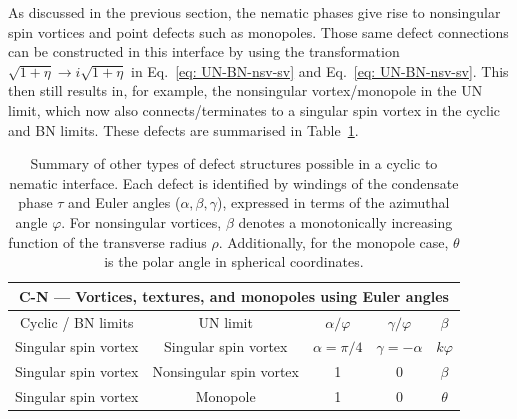 As discussed in the previous section, the nematic phases give rise to
nonsingular spin vortices and point defects such as monopoles.
Those same defect connections can be constructed in this interface by using
the transformation \(\sqrt{1+\eta} \rightarrow i\sqrt{1+\eta}\) in
Eq.~\eqref{eq: UN-BN-nsv-sv} and Eq.~\eqref{eq: UN-BN-nsv-sv}.
This then still results in, for example, the nonsingular vortex/monopole in the
UN limit, which now also connects/terminates to a singular spin vortex in the
cyclic and BN limits.
These defects are summarised in Table~\ref{tab: C-N-other}.
\begin{table}
    \centering
    \begin{tabular}{ccccc}
        \toprule
        \multicolumn{5}{c}{C-N --- Vortices, textures, and monopoles using Euler
            angles} \\
        \midrule
        Cyclic / BN limits & UN limit & \(\alpha/\varphi \)
        & \(\gamma/\varphi \) & \(\beta \) \\
        \midrule
        Singular spin vortex & Singular spin vortex & \(\alpha=\pi/4\)
            & \(\gamma=-\alpha\) & \(k\varphi\) \\
        Singular spin vortex & Nonsingular spin vortex & 1 & 0
            & \(\beta\) \\
        Singular spin vortex & Monopole & 1 & 0 & \(\theta\) \\
        \bottomrule
    \end{tabular}
    \caption[Examples of monopole and nonsingular vortex connections across a
    cyclic to nematic interface]{\label{tab: C-N-other}Summary of other types of
    defect structures possible in a cyclic to nematic interface.
    Each defect is identified by windings of the condensate phase \(\tau \) and
    Euler angles (\(\alpha, \beta, \gamma \)), expressed in terms of the
    azimuthal angle \(\varphi \).
    For nonsingular vortices, \(\beta\) denotes a monotonically increasing
    function of the transverse radius \(\rho \).
    Additionally, for the monopole case, \(\theta \) is the polar angle in
    spherical coordinates.}
\end{table}

